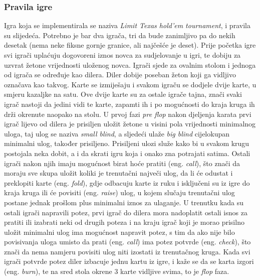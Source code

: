 \subsubsection{Pravila igre}
Igra koja se implementirala se naziva \emph{Limit Texas hold'em tournament}, i pravila su slijedeća. 
Potrebno je bar dva igrača, tri da bude zanimljivo pa do nekih desetak (nema neke fiksne gornje granice, 
ali najčešće je deset). Prije početka igre svi igrači uplaćuju dogovoreni iznos novca za sudjelovanje u igri, te dobiju za uzvrat žetone vrijednosti uloženog novca. Igrači sjede za ovalnim stolom i jednoga od igrača se određuje kao dilera. Diler dobije poseban žeton koji ga vidljivo označava kao takvog. Karte se izmiješaju i svakom igraču se dodjele dvije karte, u smjeru kazaljke na satu. Ove dvije karte su za ostale igrače tajna, znači svaki igrač nastoji da jedini vidi te karte, zapamti ih i po mogućnosti do kraja kruga ih drži okrenute naopako na stolu. U prvoj fazi \emph{pre flop} nakon djeljenja karata prvi igrač lijevo od dilera je prisiljen uložit žetone u visini pola vrijednosti minimalnog uloga, taj ulog se naziva \emph{small blind}, a sljedeći ulaže \emph{big blind} cijelokupan minimalni ulog, također prisiljeno. Prisiljeni ulozi služe kako bi u svakom krugu postojala neka dobit, a i da skrati igru koja i onako zna potrajati satima. Ostali igrači nakon njih imaju mogućnost birat hoće pratiti (eng. \textit{call}), što znači da moraju sve skupa uložit koliki je trenutačni največi ulog, da li će odustat i preklopiti karte (eng. \textit{fold}), gdje odbacuju karte iz ruku i isključeni su iz igre do kraja kruga ili će povisiti (eng. \textit{raise}) ulog, u kojem slučaju trenutačni ulog postane jednak prošlom plus minimalni iznos za ulaganje. U trenutku kada su ostali igrači napravili potez, prvi igrač do dilera mora nadoplatit ostali isnos za pratiti ili izabrati neki od drugih poteza i na kraju igrač koji je morao prisilno uložit minimalni ulog ima mogućnost napravit potez, s tim da ako nije bilo povisivanja uloga umisto da prati (eng. \textit{call}) ima potez potvrde (eng. \textit{check}), što znači da nema namjeru povisiti ulog niti izostati iz trenutačnog kruga. Kada svi igrači potvrde potez diler izbacuje jednu kartu iz igre, i kaže se da se karta izgori (eng. \textit{burn}), te na sred stola okrene 3 karte vidljive svima, to je \emph{flop} faza. 
